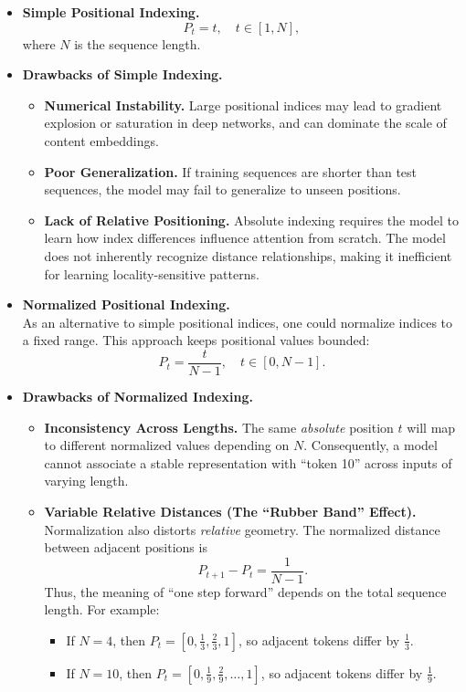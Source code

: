 \begin{itemize}
	\item \textbf{Simple Positional Indexing.}
	\begin{equation}
		\label{eq:simple_index}
		P_t = t, \quad t \in [1, N],
	\end{equation}
	where \( N \) is the sequence length.
	
	\item \textbf{Drawbacks of Simple Indexing.}
	\begin{itemize}
		\item \textbf{Numerical Instability.} Large positional indices may lead to gradient explosion or saturation in deep networks, and can dominate the scale of content embeddings.
		\item \textbf{Poor Generalization.} If training sequences are shorter than test sequences, the model may fail to generalize to unseen positions.
		\item \textbf{Lack of Relative Positioning.} Absolute indexing requires the model to learn how index differences influence attention from scratch.
		The model does not inherently recognize distance relationships, making it inefficient for learning locality-sensitive patterns.
	\end{itemize}
	
	\item \textbf{Normalized Positional Indexing.} \\
	As an alternative to simple positional indices, one could normalize indices to a fixed range.
	This approach keeps positional values bounded:
	\begin{equation}
		\label{eq:normalized_index}
		P_t = \frac{t}{N-1}, \quad t \in [0, N-1].
	\end{equation}
	
	\item \textbf{Drawbacks of Normalized Indexing.}
	\begin{itemize}
		\item \textbf{Inconsistency Across Lengths.}
		The same \emph{absolute} position \(t\) will map to different normalized values depending on \(N\).
		Consequently, a model cannot associate a stable representation with ``token 10'' across inputs of varying length.
		
		\item \textbf{Variable Relative Distances (The ``Rubber Band'' Effect).}
		Normalization also distorts \emph{relative} geometry.
		The normalized distance between adjacent positions is
		\begin{equation}
			\label{eq:normalized_step}
			P_{t+1} - P_t = \frac{1}{N-1}.
		\end{equation}
		Thus, the meaning of ``one step forward'' depends on the total sequence length.
		For example:
		\begin{itemize}
			\item If \(N=4\), then \(P_t = [0, \tfrac{1}{3}, \tfrac{2}{3}, 1]\), so adjacent tokens differ by \(\tfrac{1}{3}\).
			\item If \(N=10\), then \(P_t = [0, \tfrac{1}{9}, \tfrac{2}{9}, \dots, 1]\), so adjacent tokens differ by \(\tfrac{1}{9}\).
		\end{itemize}
		

\end{itemize}
\end{itemize}
